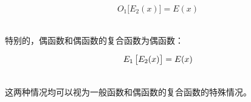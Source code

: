 \documentclass[UTF8]{ctexart}
\begin{document}
    \begin{large}
        \begin{equation*}
            O_1\big[E_2(x)\big]=E(x)
        \end{equation*}
    \end{large}\\
    特别的，偶函数和偶函数的复合函数为偶函数：
    \begin{large}
        \begin{equation*}
            E_1\hspace{1.5pt}\big[E_2(x)\big]=E(x)
        \end{equation*}
    \end{large}\\
    这两种情况均可以视为一般函数和偶函数的复合函数的特殊情况。

\newpage
\end{document}
